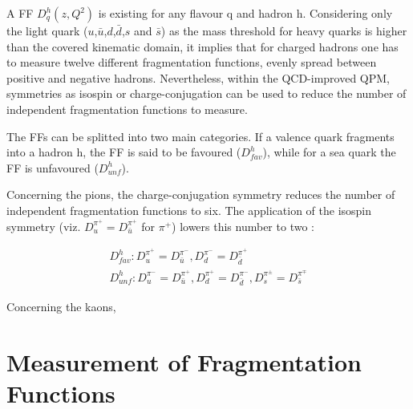A FF $D^h_q(z,Q^2)$ is existing for any flavour q and hadron h. Considering only the light quark ($u$,$\bar{u}$,$d$,$\bar{d}$,$s$ and $\bar{s}$) as the mass
threshold for heavy quarks is higher than the covered kinematic domain, it implies that for charged hadrons one has to measure twelve different fragmentation
functions, evenly spread between positive and negative hadrons. Nevertheless, within the QCD-improved QPM, symmetries as isospin or charge-conjugation can be
used to reduce the number of independent fragmentation functions to measure.

The FFs can be splitted into two main categories. If a valence quark fragments into a hadron h, the FF is said to be favoured ($D^h_{fav}$), while for a sea quark
the FF is unfavoured ($D^h_{unf}$).

Concerning the pions, the charge-conjugation symmetry reduces the number of independent fragmentation functions to six. The application of the isospin symmetry
(viz. $D^{\pi^+}_u = D^{\pi^+}_{\bar{u}}$ for $\pi^+$) lowers this number to two :

\begin{equation}
  \begin{split}
    D^h_{fav} : D^{\pi^+}_u = D^{\pi^-}_{\bar{u}}, D^{\pi^-}_d = D^{\pi^+}_{\bar{d}} \\
    D^h_{unf} : D^{\pi^-}_u = D^{\pi^+}_{\bar{u}}, D^{\pi^+}_d = D^{\pi^-}_{\bar{d}}, D^{\pi^{\pm}}_s = D^{\pi^{\mp}}_{\bar{s}}
  \end{split}
\end{equation}

Concerning the kaons, 


\section{Measurement of Fragmentation Functions}
